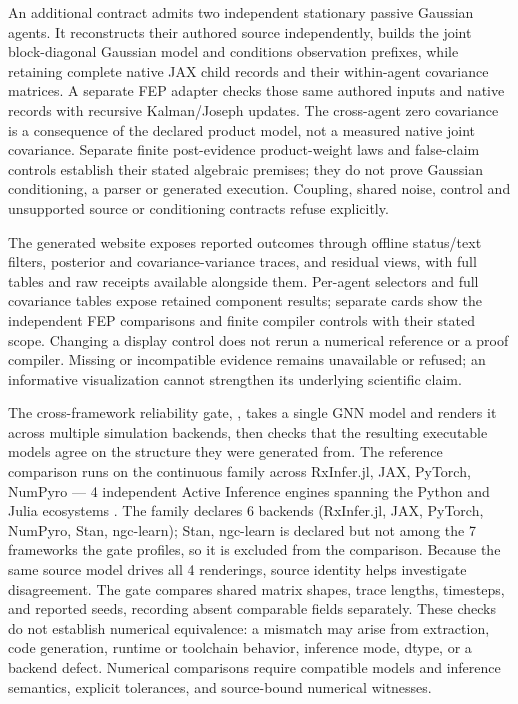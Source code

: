 \documentclass[
  english,
  9pt,
]{extarticle}
\begin{document}
An additional  contract admits two
independent stationary passive Gaussian agents. It reconstructs their
authored source independently, builds the joint block-diagonal Gaussian
model and conditions observation prefixes, while retaining complete
native JAX child records and their within-agent covariance matrices. A
separate FEP adapter checks those same authored inputs and native
records with recursive Kalman/Joseph updates. The cross-agent zero
covariance is a consequence of the declared product model, not a
measured native joint covariance. Separate finite post-evidence
product-weight laws and false-claim controls establish their stated
algebraic premises; they do not prove Gaussian conditioning, a parser or
generated execution. Coupling, shared noise, control and unsupported
source or conditioning contracts refuse explicitly.

The generated website exposes reported outcomes through offline
status/text filters, posterior and covariance-variance traces, and
residual views, with full tables and raw receipts available alongside
them. Per-agent selectors and full covariance tables expose retained
component results; separate cards show the independent FEP comparisons
and finite compiler controls with their stated scope. Changing a display
control does not rerun a numerical reference or a proof compiler.
Missing or incompatible evidence remains unavailable or refused; an
informative visualization cannot strengthen its underlying scientific
claim.

The cross-framework reliability gate,
, takes a single
GNN model and renders it across multiple simulation backends, then
checks that the resulting executable models agree on the structure they
were generated from. The reference comparison runs on the continuous
family across RxInfer.jl, JAX, PyTorch, NumPyro --- 4 independent Active
Inference engines spanning the Python and Julia ecosystems
\citep{heins2022}. The family declares 6 backends (RxInfer.jl, JAX,
PyTorch, NumPyro, Stan, ngc-learn); Stan, ngc-learn is declared but not
among the 7 frameworks the gate profiles, so it is excluded from the
comparison. Because the same source model drives all 4 renderings,
source identity helps investigate disagreement. The gate compares shared
matrix shapes, trace lengths, timesteps, and reported seeds, recording
absent comparable fields separately. These checks do not establish
numerical equivalence: a mismatch may arise from extraction, code
generation, runtime or toolchain behavior, inference mode, dtype, or a
backend defect. Numerical comparisons require compatible models and
inference semantics, explicit tolerances, and source-bound numerical
witnesses.
\end{document}
